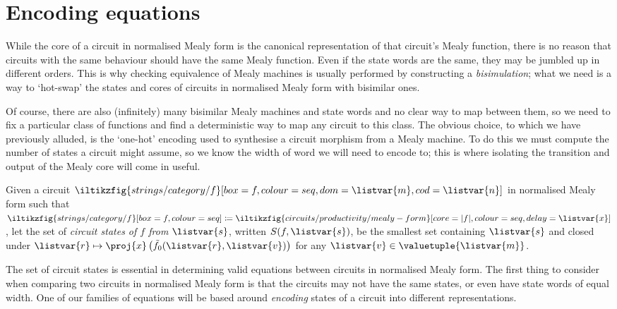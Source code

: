 \section{Encoding equations}

While the core of a circuit in normalised Mealy form is the canonical
representation of that circuit's Mealy function, there is no reason that
circuits with the same behaviour should have the same Mealy function.
Even if the state words are the same, they may be jumbled up in different
orders.
This is why checking equivalence of Mealy machines is usually performed by
constructing a \emph{bisimulation}; what we need is a way to `hot-swap' the
states and cores of circuits in normalised Mealy form with bisimilar ones.

Of course, there are also (infinitely) many bisimilar Mealy machines and state
words and no clear way to map between them, so we need to fix a particular
class of functions and find a deterministic way to map any circuit to this
class.
The obvious choice, to which we have previously alluded, is the `one-hot'
encoding used to synthesise a circuit morphism from a Mealy machine.
To do this we must compute the number of states a circuit might assume, so we
know the width of word we will need to encode to; this is where isolating the
transition and output of the Mealy core will come in useful.

\begin{definition}
    Given a circuit \(
    \iltikzfig{strings/category/f}[box=f,colour=seq,dom=\listvar{m},cod=\listvar{n}]
    \) in normalised Mealy form such that \(
    \iltikzfig{strings/category/f}[box=f,colour=seq]
    \coloneqq
    \iltikzfig{circuits/productivity/mealy-form}[core=|f|,colour=seq,delay=\listvar{x}]
    \), let the set of \emph{circuit states of \(f\) from \(\listvar{s}\)},
    written \(S(f,\listvar{s})\), be the smallest set containing \(\listvar{s}\)
    and closed under \(
    \listvar{r} \mapsto \proj{x}\left(\tilde{f}_0(\listvar{r},\listvar{v})\right)
    \) for any \(\listvar{v} \in \valuetuple{\listvar{m}}\).
\end{definition}

The set of circuit states is essential in determining valid equations between
circuits in normalised Mealy form.
The first thing to consider when comparing two circuits in normalised Mealy
form is that the circuits may not have the same states, or even have state words
of equal width.
One of our families of equations will be based around \emph{encoding} states
of a circuit into different representations.

